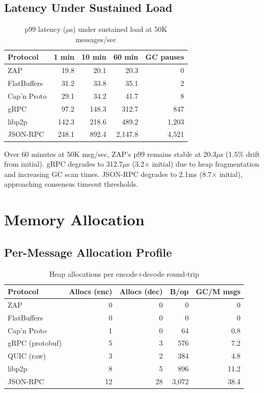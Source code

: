 \documentclass[11pt,letterpaper]{article}
\begin{document}
\subsection{Latency Under Sustained Load}

\begin{table}[h]
\centering
\caption{p99 latency ($\mu$s) under sustained load at 50K messages/sec}
\label{tab:latency-load}
\begin{tabular}{lrrrr}
\toprule
\textbf{Protocol} & \textbf{1 min} & \textbf{10 min} & \textbf{60 min} & \textbf{GC pauses} \\
\midrule
\rowcolor{luxblue!10}
ZAP & 19.8 & 20.1 & 20.3 & 0 \\
FlatBuffers & 31.2 & 33.8 & 35.1 & 2 \\
Cap'n Proto & 29.1 & 34.2 & 41.7 & 8 \\
gRPC & 97.2 & 148.3 & 312.7 & 847 \\
libp2p & 142.3 & 218.6 & 489.2 & 1,203 \\
JSON-RPC & 248.1 & 892.4 & 2,147.8 & 4,521 \\
\bottomrule
\end{tabular}
\end{table}

Over 60 minutes at 50K msg/sec, ZAP's p99 remains stable at 20.3$\mu$s (1.5\% drift from initial). gRPC degrades to 312.7$\mu$s (3.2$\times$ initial) due to heap fragmentation and increasing GC scan times. JSON-RPC degrades to 2.1ms (8.7$\times$ initial), approaching consensus timeout thresholds.

\section{Memory Allocation}

\subsection{Per-Message Allocation Profile}

\begin{table}[h]
\centering
\caption{Heap allocations per encode+decode round-trip}
\label{tab:allocs}
\small
\begin{tabular}{lrrrr}
\toprule
\textbf{Protocol} & \textbf{Allocs (enc)} & \textbf{Allocs (dec)} & \textbf{B/op} & \textbf{GC/M msgs} \\
\midrule
\rowcolor{luxblue!10}
ZAP & 0 & 0 & 0 & 0 \\
FlatBuffers & 0 & 0 & 0 & 0 \\
Cap'n Proto & 1 & 0 & 64 & 0.8 \\
gRPC (protobuf) & 5 & 3 & 576 & 7.2 \\
QUIC (raw) & 3 & 2 & 384 & 4.8 \\
libp2p & 8 & 5 & 896 & 11.2 \\
JSON-RPC & 12 & 28 & 3,072 & 38.4 \\
\bottomrule
\end{tabular}
\end{table}
\end{document}
